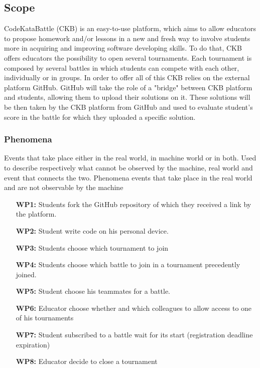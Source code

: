 \documentclass{article}
\newcounter{subsubsubsection}[subsubsection]
\begin{document}
\subsection{Scope}
    CodeKataBattle (CKB) is an easy-to-use platform, which aims to allow educators to propose homework and/or lessons in a new and fresh way to involve students more in acquiring and improving software developing skills. To do that, CKB offers educators the possibility to open several tournaments. Each tournament is composed by several battles in which students can compete with each other, individually or in groups. 
    In order to offer all of this CKB relies on the external platform GitHub. GitHub will take the role of a "bridge" between CKB platform and students, allowing them to upload their solutions on it. These solutions will be then taken by the CKB platform from GitHub and used to evaluate student's score in the battle for which they uploaded a specific solution. 
\subsubsection{Phenomena}
    Events that take place either in the real world, in machine world or in both. Used to describe respectively what cannot be observed by the machine, real world and event that connects the two.
        Phenomena events that take place in the real world and are not observable by the machine
        \begin{enumerate}
            \item[\textbf{WP1:}] Students fork the GitHub repository of which they received a link by the platform.
            \item[\textbf{WP2:}] Student write code on his personal device.
            \item[\textbf{WP3:}] Students choose which tournament to join
            \item[\textbf{WP4:}] Students choose which battle to join in a tournament precedently joined.
            \item[\textbf{WP5:}] Student choose his teammates for a battle.
            \item[\textbf{WP6:}] Educator choose whether and which colleagues to allow access to one of his tournaments
            \item[\textbf{WP7:}] Student subscribed to a battle wait for its start (registration deadline expiration)
            \item[\textbf{WP8:}] Educator decide to close a tournament
        \end{enumerate}
\end{document}
